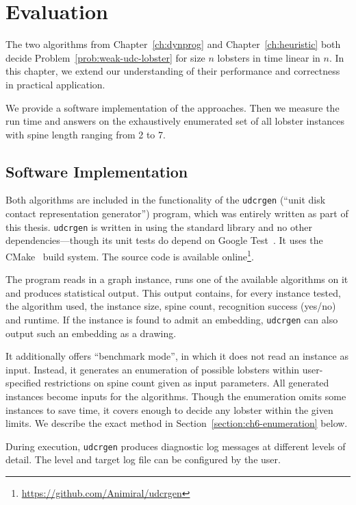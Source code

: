 \chapter{Evaluation}
\label{ch:evaluation}

The two algorithms from Chapter~\ref{ch:dynprog} and Chapter~\ref{ch:heuristic} both decide Problem~\ref{prob:weak-udc-lobster} for size $n$ lobsters in time linear in $n$. In this chapter, we extend our understanding of their performance and correctness in practical application.

We provide a software implementation of the approaches. Then we measure the run time and answers on the exhaustively enumerated set of all lobster instances with spine length ranging from 2 to 7.

\section{Software Implementation}

Both algorithms are included in the functionality of the \texttt{udcrgen} (``unit disk contact representation generator'') program, which was entirely written as part of this thesis. \texttt{udcrgen} is written in \cpp{} using the standard library and no other dependencies---though its unit tests do depend on Google Test~\cite{GoogleTest}. It uses the CMake~\cite{CMake} build system. The source code is available online\footnote{\url{https://github.com/Animiral/udcrgen}}.

The program reads in a graph instance, runs one of the available algorithms on it and produces statistical output. This output contains, for every instance tested, the algorithm used, the instance size, spine count, recognition success (yes/no) and runtime. If the instance is found to admit an embedding, \texttt{udcrgen} can also output such an embedding as a drawing.

It additionally offers ``benchmark mode'', in which it does not read an instance as input. Instead, it generates an enumeration of possible lobsters within user-specified restrictions on spine count given as input parameters. All generated instances become inputs for the algorithms. Though the enumeration omits some instances to save time, it covers enough to decide any lobster within the given limits. We describe the exact method in Section~\ref{section:ch6-enumeration} below.

During execution, \texttt{udcrgen} produces diagnostic log messages at different levels of detail. The level and target log file can be configured by the user.

